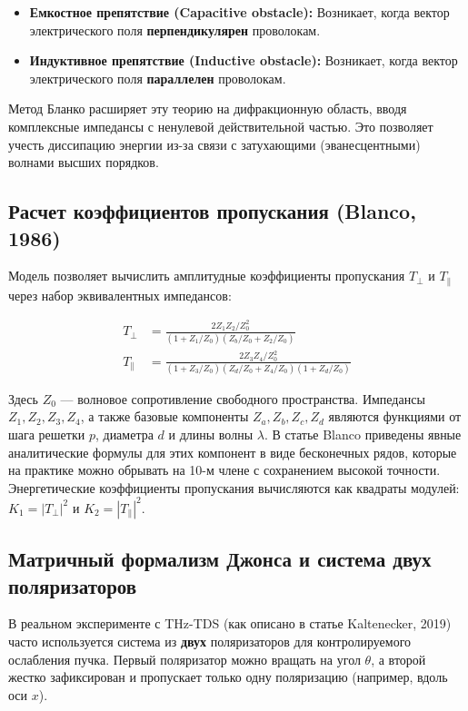 \begin{itemize}
    \item \textbf{Емкостное препятствие (Capacitive obstacle):} Возникает, когда вектор электрического поля \textbf{перпендикулярен} проволокам.
    \item \textbf{Индуктивное препятствие (Inductive obstacle):} Возникает, когда вектор электрического поля \textbf{параллелен} проволокам.
\end{itemize}

Метод Бланко расширяет эту теорию на дифракционную область, вводя комплексные импедансы с ненулевой действительной частью. Это позволяет учесть диссипацию энергии из-за связи с затухающими (эванесцентными) волнами высших порядков.

\subsection{Расчет коэффициентов пропускания (Blanco, 1986)}

Модель позволяет вычислить амплитудные коэффициенты пропускания $T_\perp$ и $T_\parallel$ через набор эквивалентных импедансов:

\begin{align}
    T_\perp &= \frac{2 Z_1 Z_2 / Z_0^2}{(1 + Z_1/Z_0)(Z_b/Z_0 + Z_2/Z_0)} \label{eq:T_perp} \\
    T_\parallel &= \frac{2 Z_3 Z_4 / Z_0^2}{(1 + Z_3/Z_0)(Z_d/Z_0 + Z_4/Z_0)(1 + Z_d/Z_0)} \label{eq:T_par}
\end{align}

Здесь $Z_0$ — волновое сопротивление свободного пространства. Импедансы $Z_1, Z_2, Z_3, Z_4$, а также базовые компоненты $Z_a, Z_b, Z_c, Z_d$ являются функциями от шага решетки $p$, диаметра $d$ и длины волны $\lambda$. В статье Blanco приведены явные аналитические формулы для этих компонент в виде бесконечных рядов, которые на практике можно обрывать на 10-м члене с сохранением высокой точности. Энергетические коэффициенты пропускания вычисляются как квадраты модулей: $K_1 = |T_\perp|^2$ и $K_2 = |T_\parallel|^2$.

\subsection{Матричный формализм Джонса и система двух поляризаторов}

В реальном эксперименте с THz-TDS (как описано в статье Kaltenecker, 2019) часто используется система из \textbf{двух} поляризаторов для контролируемого ослабления пучка. Первый поляризатор можно вращать на угол $\theta$, а второй жестко зафиксирован и пропускает только одну поляризацию (например, вдоль оси $x$).

